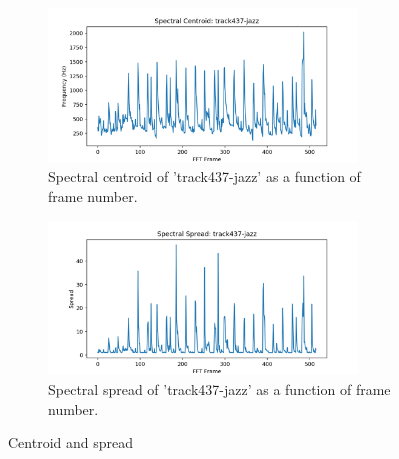 \documentclass[11pt,a4paper]{article}
\begin{document}
\begin{figure}[tb]\ContinuedFloat
	\begin{subfigure}[t]{\hsize}
		\centering
		\includegraphics[width=0.9\textwidth]{centroid_track437-jazz}
		\caption{Spectral centroid of 'track437-jazz' as a function of frame number.}
		\label{fig:centroid_jazz}
	\end{subfigure}
	\begin{subfigure}[t]{\hsize}
		\centering
		\includegraphics[width=0.9\textwidth]{spread_track437-jazz}
		\caption{Spectral spread of 'track437-jazz' as a function of frame number.}
		\label{fig:spread_jazz}
	\end{subfigure}
	\caption{Centroid and spread}
\end{figure}
\clearpage
\end{document}

